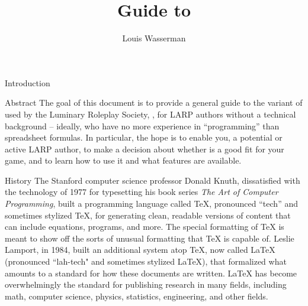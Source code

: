 \documentclass[sheet]{GameTexBase}
\title{Guide to \gametex{}}
\author{Louis Wasserman}
\begin{document}
\maketitle{}
\setcounter{tocdepth}{2}
\tableofcontents
\begin{section}{Introduction}
\begin{subsection}{Abstract}
The goal of this document is to provide a general guide to the variant of \gametex{} used by the Luminary Roleplay Society, \lrstex{}, for LARP authors without a technical background -- ideally, who have no more experience in ``programming'' than spreadsheet formulas.  In particular, the hope is to enable you, a potential or active LARP author, to make a decision about whether \lrstex{} is a good fit for your game, and to learn how to use it and what features are available.

\end{subsection}
\begin{subsection}{History}
The Stanford computer science professor Donald Knuth, dissatisfied with the technology of 1977 for typesetting his book series \textit{The Art of Computer Programming}, built a programming language called TeX,
pronounced ``tech'' and sometimes stylized \TeX{}, for generating clean, readable versions of content that can include equations, programs, and more.  The special formatting of \TeX{} is 
meant to show off the sorts of unusual formatting that \TeX{} is capable of.
Leslie Lamport, in 1984, built an additional system atop \TeX{}, now called LaTeX (pronounced ``lah-tech" and sometimes stylized \LaTeX{}), that formalized what amounts to a standard for how these documents are written.  LaTeX has become overwhelmingly the standard for publishing research in many fields, including math, computer science, physics, statistics, engineering, and other fields.


\end{subsection}
\end{section}
\end{document}
